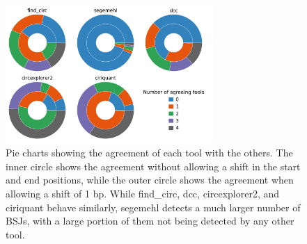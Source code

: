 \begin{figure}[ht]
    \centering

    \includegraphics[width=0.7\textwidth]{chapters/4_results_and_discussion/figures/detection/pies.png}
    \caption{Pie charts showing the agreement of each tool with the others.
        The inner circle shows the agreement without allowing a shift in the start and
        end positions, while the outer circle shows the agreement when allowing a shift
        of 1 bp.
        While find\_circ, dcc, circexplorer2, and ciriquant behave similarly, segemehl
        detects a much larger number of BSJs, with a large portion of them not being
        detected by any other tool.
    }
    \label{fig:detection_pies}
\end{figure}

